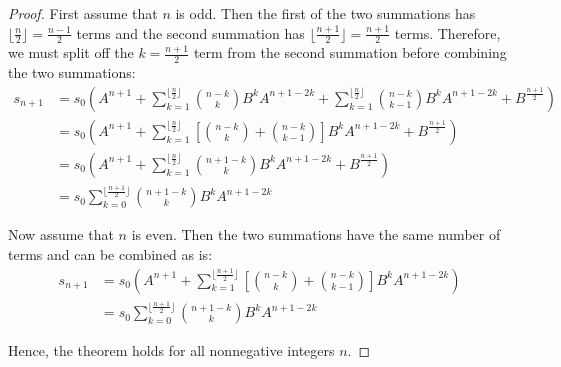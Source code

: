\documentclass[12pt]{article}
\begin{document}
\begin{proof}
First assume that $n$ is odd.  Then the first of the two summations has $\lfloor\frac{n}{2}\rfloor=\frac{n-1}{2}$ terms and the second summation has $\lfloor\frac{n+1}{2}\rfloor=\frac{n+1}{2}$ terms.  Therefore, we must split off the $k=\frac{n+1}{2}$ term from the second summation before combining the two summations:
\begin{align*}
s_{n+1} & =s_0\left( A^{n+1}+\sum_{k=1}^{\lfloor\frac{n}{2}\rfloor} \binom{n-k}{k} B^k A^{n+1-2k}
+\sum_{k=1}^{\lfloor\frac{n}{2}\rfloor} \binom{n-k}{k-1} B^k A^{n+1-2k} +B^{\frac{n+1}{2}} \right) \\
& =s_0\left( A^{n+1}+\sum_{k=1}^{\lfloor\frac{n}{2}\rfloor} \left[ \binom{n-k}{k}+\binom{n-k}{k-1} \right] B^k A^{n+1-2k} +B^{\frac{n+1}{2}} \right) \\
& =s_0\left( A^{n+1}+\sum_{k=1}^{\lfloor\frac{n}{2}\rfloor} \binom{n+1-k}{k} B^k A^{n+1-2k} +B^{\frac{n+1}{2}} \right) \\
& =s_0\sum_{k=0}^{\lfloor\frac{n+1}{2}\rfloor} \binom{n+1-k}{k} B^k A^{n+1-2k}
\end{align*}

Now assume that $n$ is even.  Then the two summations have the same number of terms and can be combined as is:
\begin{align*}
s_{n+1} & =s_0\left( A^{n+1}+\sum_{k=1}^{\lfloor\frac{n+1}{2}\rfloor} \left[ \binom{n-k}{k}+\binom{n-k}{k-1} \right] B^k A^{n+1-2k} \right) \\
& =s_0\sum_{k=0}^{\lfloor\frac{n+1}{2}\rfloor} \binom{n+1-k}{k} B^k A^{n+1-2k}
\end{align*}

Hence, the theorem holds for all nonnegative integers $n$.
\end{proof}
\end{document}
